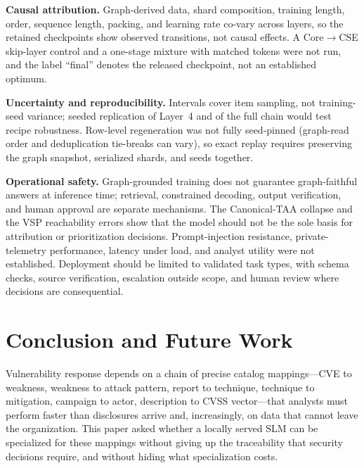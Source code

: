 \documentclass[conference]{IEEEtran}
\begin{document}
\textbf{Causal attribution.} Graph-derived data, shard composition, training length, order, sequence length, packing, and learning rate co-vary across layers, so the retained checkpoints show observed transitions, not causal effects. A Core$\rightarrow$CSE skip-layer control and a one-stage mixture with matched tokens were not run, and the label ``final'' denotes the released checkpoint, not an established optimum.

\textbf{Uncertainty and reproducibility.} Intervals cover item sampling, not training-seed variance; seeded replication of Layer~4 and of the full chain would test recipe robustness. Row-level regeneration was not fully seed-pinned (graph-read order and deduplication tie-breaks can vary), so exact replay requires preserving the graph snapshot, serialized shards, and seeds together.

\textbf{Operational safety.} Graph-grounded training does not guarantee graph-faithful answers at inference time; retrieval, constrained decoding, output verification, and human approval are separate mechanisms. The Canonical-TAA collapse and the VSP reachability errors show that the model should not be the sole basis for attribution or prioritization decisions. Prompt-injection resistance, private-telemetry performance, latency under load, and analyst utility were not established. Deployment should be limited to validated task types, with schema checks, source verification, escalation outside scope, and human review where decisions are consequential.

\section{Conclusion and Future Work}
Vulnerability response depends on a chain of precise catalog mappings---CVE to weakness, weakness to attack pattern, report to technique, technique to mitigation, campaign to actor, description to CVSS vector---that analysts must perform faster than disclosures arrive and, increasingly, on data that cannot leave the organization. This paper asked whether a locally served SLM can be specialized for these mappings without giving up the traceability that security decisions require, and without hiding what specialization costs.
\end{document}
